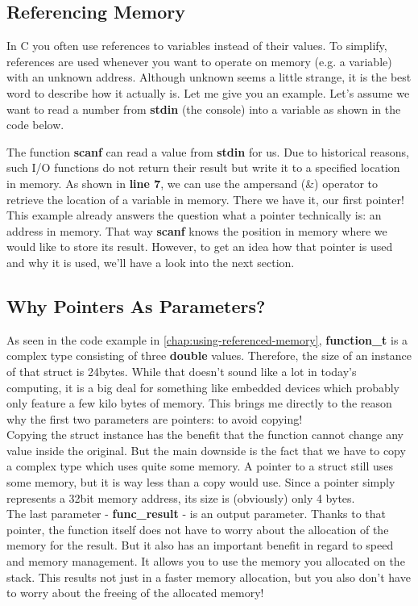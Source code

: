 \documentclass{article}
\begin{document}
  \subsection{Referencing Memory}
  In C you often use references to variables instead of their values.
  To simplify, references are used whenever you want to operate on memory (e.g. a variable) with an unknown address.
  Although unknown seems a little strange, it is the best word to describe how it actually is.
  Let me give you an example.
  Let's assume we want to read a number from \textbf{stdin} (the console) into a variable as shown in the code below.
  
  The function \textbf{scanf} can read a value from \textbf{stdin} for us.
  Due to historical reasons, such I/O functions do not return their result but write it to a specified location in memory.
  As shown in \textbf{line 7}, we can use the ampersand (\&) operator to retrieve the location of a variable in memory.
  There we have it, our first pointer!
  This example already answers the question what a pointer technically is: an address in memory.
  That way \textbf{scanf} knows the position in memory where we would like to store its result.
  However, to get an idea how that pointer is used and why it is used, we'll have a look into the next section.
  \newpage
  \subsection{Why Pointers As Parameters?}
  As seen in the code example in \autoref{chap:using-referenced-memory}, \textbf{function\_t} is a complex type consisting of three \textbf{double} values.
  Therefore, the size of an instance of that struct is 24bytes.
  While that doesn't sound like a lot in today's computing, it is a big deal for something like embedded devices which probably only feature a few kilo bytes of memory.
  This brings me directly to the reason why the first two parameters are pointers: to avoid copying!
  \\Copying the struct instance has the benefit that the function cannot change any value inside the original.
  But the main downside is the fact that we have to copy a complex type which uses quite some memory.
  A pointer to a struct still uses some memory, but it is way less than a copy would use.
  Since a pointer simply represents a 32bit memory address, its size is (obviously) only 4 bytes.
  \\The last parameter - \textbf{func\_result} - is an output parameter.
  Thanks to that pointer, the function itself does not have to worry about the allocation of the memory for the result.
  But it also has an important benefit in regard to speed and memory management.
  It allows you to use the memory you allocated on the stack.
  This results not just in a faster memory allocation, but you also don't have to worry about the freeing of the allocated memory!
\end{document}
